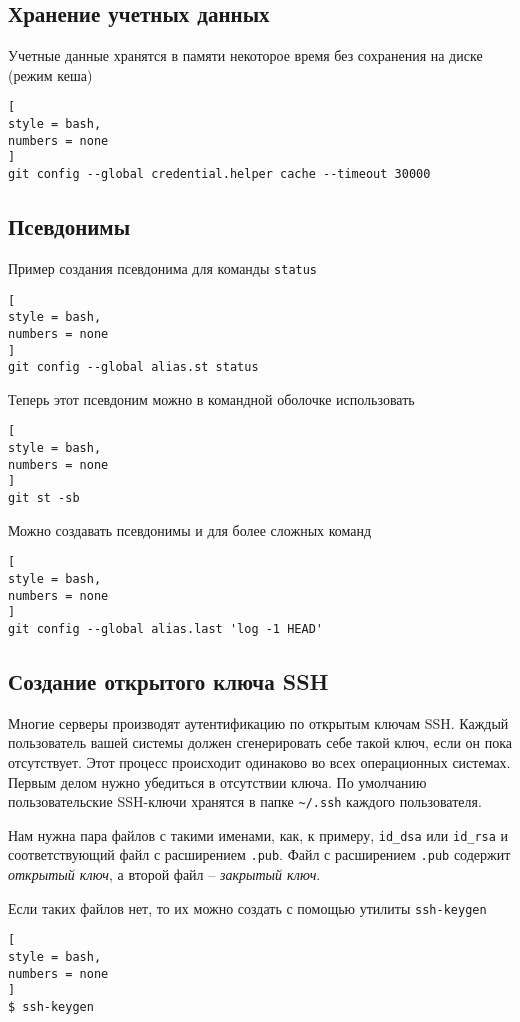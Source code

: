 \documentclass[%
	11pt,
	a4paper,
	utf8,
		]{article}
\begin{document}
\subsection{Хранение учетных данных}

Учетные данные хранятся в памяти некоторое время без сохранения на диске (режим кеша)
\begin{lstlisting}[
style = bash,
numbers = none
]
git config --global credential.helper cache --timeout 30000
\end{lstlisting}

\subsection{Псевдонимы}

Пример создания псевдонима для команды \texttt{status}
\begin{lstlisting}[
style = bash,
numbers = none
]
git config --global alias.st status
\end{lstlisting}

Теперь этот псевдоним можно в командной оболочке использовать
\begin{lstlisting}[
style = bash,
numbers = none
]
git st -sb
\end{lstlisting}

Можно создавать псевдонимы и для более сложных команд
\begin{lstlisting}[
style = bash,
numbers = none
]
git config --global alias.last 'log -1 HEAD'
\end{lstlisting}

\subsection{Создание открытого ключа SSH}

Многие серверы производят аутентификацию по открытым ключам SSH. Каждый пользователь вашей системы должен сгенерировать себе такой ключ, если он пока отсутствует. Этот процесс происходит одинаково во всех операционных системах. Первым делом нужно убедиться в отсутствии ключа. По умолчанию пользовательские SSH-ключи хранятся в папке \verb|~/.ssh| каждого пользователя.

Нам нужна пара файлов с такими именами, как, к примеру, \texttt{id\_dsa} или \texttt{id\_rsa} и соответствующий файл с расширением \texttt{.pub}. Файл с расширением \texttt{.pub} содержит \emph{открытый ключ}, а второй файл -- \emph{закрытый ключ}.

Если таких файлов нет, то их можно создать с помощью утилиты \texttt{ssh-keygen}
\begin{lstlisting}[
style = bash,
numbers = none
]
$ ssh-keygen
\end{lstlisting}
\end{document}
